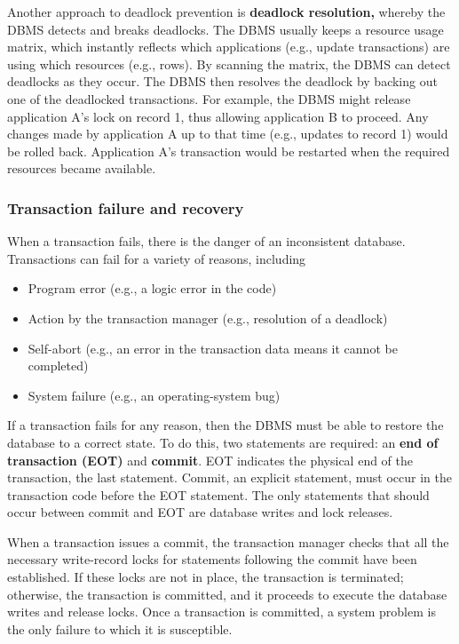 \documentclass[
]{article}
\begin{document}
Another approach to deadlock prevention is \textbf{deadlock resolution,}
whereby the DBMS detects and breaks deadlocks. The DBMS usually keeps a
resource usage matrix, which instantly reflects which applications
(e.g., update transactions) are using which resources (e.g., rows). By
scanning the matrix, the DBMS can detect deadlocks as they occur. The
DBMS then resolves the deadlock by backing out one of the deadlocked
transactions. For example, the DBMS might release application A's lock
on record 1, thus allowing application B to proceed. Any changes made by
application A up to that time (e.g., updates to record 1) would be
rolled back. Application A's transaction would be restarted when the
required resources became available.

\hypertarget{transaction-failure-and-recovery}{%
\subsubsection*{Transaction failure and recovery}\label{transaction-failure-and-recovery}}

When a transaction fails, there is the danger of an inconsistent
database. Transactions can fail for a variety of reasons, including

\begin{itemize}
\item
  Program error (e.g., a logic error in the code)
\item
  Action by the transaction manager (e.g., resolution of a deadlock)
\item
  Self-abort (e.g., an error in the transaction data means it cannot
  be completed)
\item
  System failure (e.g., an operating-system bug)
\end{itemize}

If a transaction fails for any reason, then the DBMS must be able to
restore the database to a correct state. To do this, two statements are
required: an \textbf{end of transaction (EOT)} and \textbf{commit}. EOT indicates
the physical end of the transaction, the last statement. Commit, an
explicit statement, must occur in the transaction code before the EOT
statement. The only statements that should occur between commit and EOT
are database writes and lock releases.

When a transaction issues a commit, the transaction manager checks that
all the necessary write-record locks for statements following the commit
have been established. If these locks are not in place, the transaction
is terminated; otherwise, the transaction is committed, and it proceeds
to execute the database writes and release locks. Once a transaction is
committed, a system problem is the only failure to which it is
susceptible.
\end{document}
